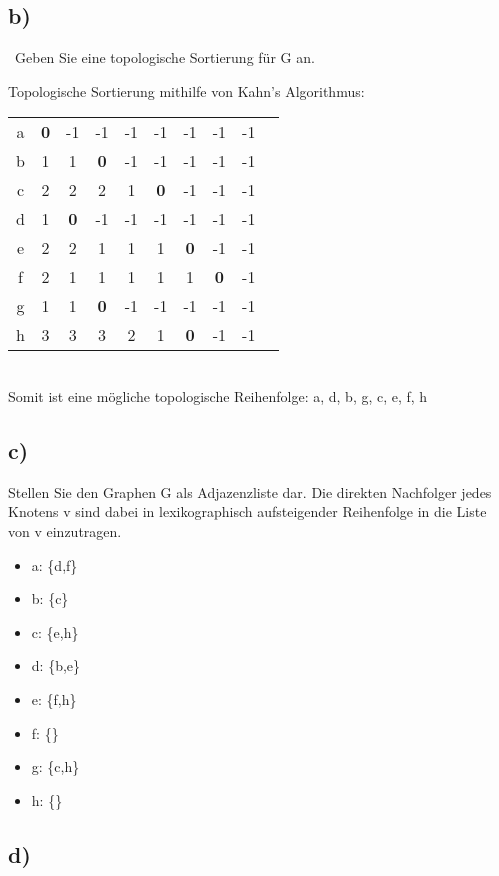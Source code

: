 \documentclass[a4paper]{article}
\begin{document}
\subsection*{b)}\
Geben Sie eine topologische Sortierung für G an.

Topologische Sortierung mithilfe von Kahn's Algorithmus:\\

\begin{tabular}{ c|c|c|c|c|c|c|c|c|c}
    a & \textbf{0} & -1 & -1 & -1 & -1 & -1 & -1 & -1 \\
    b & 1 & 1 & \textbf{0} & -1 & -1 & -1 & -1 & -1 \\
    c & 2 & 2 & 2 & 1 & \textbf{0} & -1 & -1 & -1 \\
    d & 1 & \textbf{0} & -1 & -1 & -1 & -1 & -1 & -1 \\
    e & 2 & 2 & 1 & 1 & 1 & \textbf{0} & -1 & -1 \\
    f & 2 & 1 & 1 & 1 & 1 & 1 & \textbf{0} & -1 \\
    g & 1 & 1 & \textbf{0} & -1 & -1 & -1 & -1 & -1 \\
    h & 3 & 3 & 3 & 2 & 1 & \textbf{0} & -1 & -1 \\
\end{tabular}\\


Somit ist eine mögliche topologische Reihenfolge: a, d, b, g, c, e, f, h


\subsection*{c)}
Stellen Sie den Graphen G als Adjazenzliste dar. Die direkten Nachfolger jedes Knotens v sind
dabei in lexikographisch aufsteigender Reihenfolge in die Liste von v einzutragen.

\begin{itemize}
    \item a: \{d,f\}
    \item b: \{c\}
    \item c: \{e,h\}
    \item d: \{b,e\}
    \item e: \{f,h\}
    \item f: \{\}
    \item g: \{c,h\}
    \item h: \{\}
\end{itemize}


\subsection*{d)}
\end{document}
